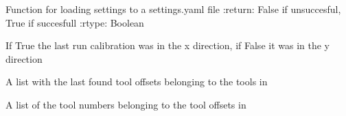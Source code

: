 \documentclass[letterpaper,10pt,english]{sphinxmanual}
\begin{document}
\begin{fulllineitems}
\begin{fulllineitems}
\label{\detokenize{index:app.MainWindow.load_settings}}
\sphinxAtStartPar
Function for loading settings to a settings.yaml file
:return: False if unsuccesful, True if succesfull
:rtype: Boolean

\end{fulllineitems}


\begin{fulllineitems}
\label{\detokenize{index:app.MainWindow.offset_direction}}
\sphinxAtStartPar
If True the last run calibration was in the x direction, if False it was in the y direction

\end{fulllineitems}


\begin{fulllineitems}
\label{\detokenize{index:app.MainWindow.offset_list}}
\sphinxAtStartPar
A list with the last found tool offsets belonging to the tools in {\hyperref[\detokenize{index:app.MainWindow.offset_tool_list}]{}}

\end{fulllineitems}


\begin{fulllineitems}
\label{\detokenize{index:app.MainWindow.offset_tool_list}}
\sphinxAtStartPar
A list of the tool numbers belonging to the tool offsets in {\hyperref[\detokenize{index:app.MainWindow.offset_list}]{}}


\end{fulllineitems}
\end{fulllineitems}
\end{document}
